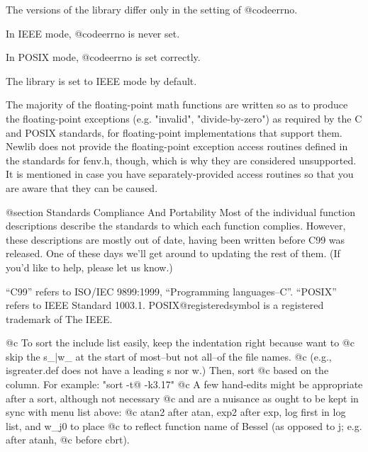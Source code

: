 The versions of the library differ only in the setting of @code{errno}.

In IEEE mode, @code{errno} is never set.

In POSIX mode, @code{errno} is set correctly.

The library is set to IEEE mode by default.

The majority of the floating-point math functions are written
so as to produce the floating-point exceptions (e.g. "invalid",
"divide-by-zero") as required by the C and POSIX standards, for
floating-point implementations that support them.  Newlib does not provide
the floating-point exception access routines defined in the standards
for fenv.h, though, which is why they are considered unsupported.  It is
mentioned in case you have separately-provided access routines so that
you are aware that they can be caused.

@section Standards Compliance And Portability
Most of the individual function descriptions describe the standards to which
each function complies.  However, these descriptions are mostly out of date,
having been written before C99 was released.  One of these days we'll get
around to updating the rest of them.  (If you'd like to help, please let us
know.)

``C99'' refers to ISO/IEC 9899:1999, ``Programming languages--C''.
``POSIX'' refers to IEEE Standard 1003.1.  POSIX@registeredsymbol{} is a
registered trademark of The IEEE.

@c To sort the include list easily, keep the indentation right because want to
@c skip the s_|w_ at the start of most--but not all--of the file names.
@c (e.g., isgreater.def does not have a leading s nor w.)  Then, sort
@c based on the column.  For example:  "sort -t@ -k3.17"
@c A few hand-edits might be appropriate after a sort, although not necessary
@c and are a nuisance as ought to be kept in sync with menu list above:
@c atan2 after atan, exp2 after exp, log first in log list, and w_j0 to place
@c to reflect function name of Bessel (as opposed to j; e.g. after atanh,
@c before cbrt).

